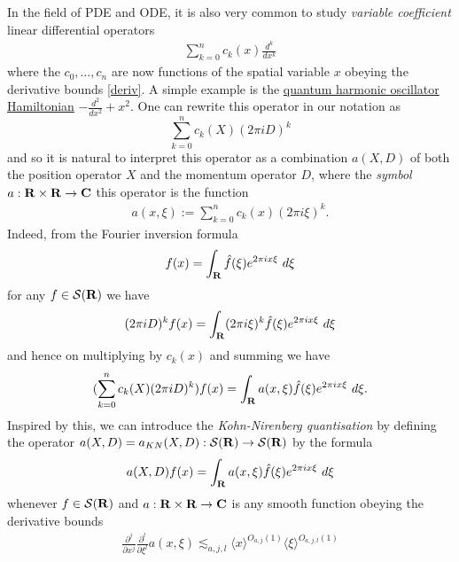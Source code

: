 \documentclass[11pt]{article}
\theoremstyle{definition}
\theoremstyle{remark}
\begin{document}
In the field of PDE and ODE, it is also very common to study \emph{variable coefficient} linear differential operators 
\begin{align}\label{ckk}
  \sum_{k=0}^n c_k(x) \frac{d^k}{dx^k} 
\end{align}
 where the \({c_0,\dots,c_n}\) are now functions of the spatial variable \({x}\) obeying the derivative bounds \eqref{deriv}. A simple example is the \href{https://en.wikipedia.org/wiki/Quantum_harmonic_oscillator}{quantum harmonic oscillator Hamiltonian} \({-\frac{d^2}{dx^2} + x^2}\). One can rewrite this operator in our notation as 
\[\displaystyle  \sum_{k=0}^n c_k(X) (2\pi i D)^k\]
 and so it is natural to interpret this operator as a combination \({a(X,D)}\) of both the position operator \({X}\) and the momentum operator \({D}\), where the \emph{symbol} \({a: {\bf R} \times {\bf R} \rightarrow {\bf C}}\) this operator is the function 
\begin{align}\label{akk}
  a(x,\xi) := \sum_{k=0}^n c_k(x) (2\pi i \xi)^k. 
\end{align}
 Indeed, from the Fourier inversion formula 
\[\displaystyle  f(x) = \int_{\bf R} \hat f(\xi) e^{2\pi i x \xi}\ d\xi\]
 for any \({f \in {\mathcal S}({\bf R})}\) we have 
\[\displaystyle  (2\pi i D)^k f(x) = \int_{\bf R} (2\pi i \xi)^k \hat f(\xi) e^{2\pi i x \xi}\ d\xi\]
 and hence on multiplying by \({c_k(x)}\) and summing we have 
\[\displaystyle (\sum_{k=0}^n c_k(X) (2\pi i D)^k) f(x) = \int_{\bf R} a(x,\xi) \hat f(\xi) e^{2\pi i x \xi}\ d\xi.\]
 Inspired by this, we can introduce the \emph{Kohn-Nirenberg quantisation} by defining the operator \({a(X,D) = a_{KN}(X,D): {\mathcal S}({\bf R}) \rightarrow {\mathcal S}({\bf R})}\) by the formula 
\begin{align}\label{axd}
  a(X,D) f(x) = \int_{\bf R} a(x,\xi) \hat f(\xi) e^{2\pi i x \xi}\ d\xi 
\end{align}
 whenever \({f \in {\mathcal S}({\bf R})}\) and \({a: {\bf R} \times {\bf R} \rightarrow {\bf C}}\) is any smooth function obeying the derivative bounds 
\begin{align}\label{deriv-2}
  \frac{\partial^j}{\partial x^j} \frac{\partial^l}{\partial \xi^l} a(x,\xi) \lesssim_{a,j,l} \langle x \rangle^{O_{a,j}(1)} \langle \xi \rangle^{O_{a,j,l}(1)} 
\end{align}
\end{document}
